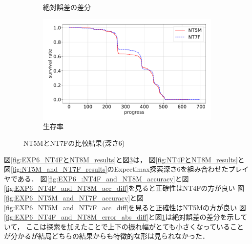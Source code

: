 \begin{figure}[t]
\begin{subfigure}[b]{0.49\linewidth}
    \caption{絶対誤差の差分}
    \label{fig:EXP6_NT5M_and_NT7F_error_abs_diff}
\end{subfigure}
\begin{subfigure}[b]{0.49\linewidth}
    \includegraphics[width=\linewidth]{pdf/compare/EXP6_NT5M_and_NT7F/survival.pdf}
    \caption{生存率}
    \label{fig:EXP6_NT5M_and_NT7F_survival}
\end{subfigure}
\caption{NT5MとNT7Fの比較結果(深さ6)}
\label{fig:EXP6_NT5M_and_NT7F_results}
\end{figure}

図\ref{fig:EXP6_NT4FとNT8M_results}と図\ref{fig:EXP6_NT5M_and_NT7F_results}は，
図\ref{fig:NT4FとNT8M_results}と図\ref{fig:NT5M_and_NT7F_results}のExpectimax探索深さ6を組み合わせたプレイヤである．
図\ref{fig:EXP6_:NT4F_and_NT8M_accuracy}と図\ref{fig:EXP6_NT4F_and_NT8M_acc_diff}を見ると正確性はNT4Fの方が良い
図\ref{fig:EXP6_NT5M_and_NT7F_accuracy}と図\ref{fig:EXP6_NT5M_and_NT7F_acc_diff}を見ると正確性はNT5Mの方が良い
図\ref{fig:EXP6_NT4F_and_NT8M_error_abs_diff}と図\ref{fig:EXP6_NT5M_and_NT7F_error_abs_diff}は絶対誤差の差分を示していて，
ここは探索を加えたことで上下の振れ幅がとても小さくなっていることが分かるが結局どちらの結果からも特徴的な形は見られなかった．
